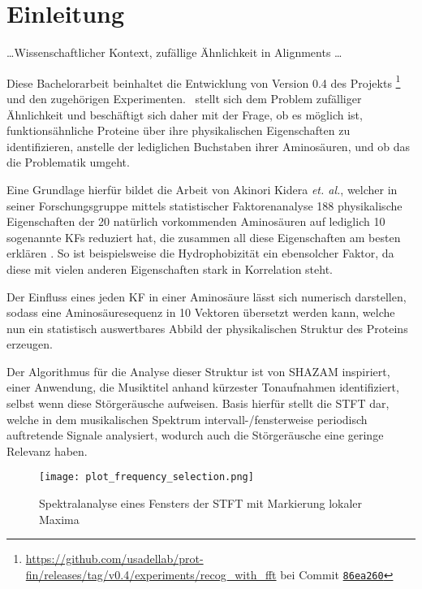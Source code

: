 \section{Einleitung} %
    \label{sec:einleitung}
    \dots Wissenschaftlicher Kontext, zufällige Ähnlichkeit in Alignments \dots

    Diese Bachelorarbeit beinhaltet die Entwicklung von Version 0.4 des Projekts \protfin\footnote{\url{https://github.com/usadellab/prot-fin/releases/tag/v0.4/experiments/recog_with_fft} bei Commit \href{https://github.com/usadellab/prot-fin/tree/86ea260b7c6d7bb520b57e2b29e350bd3942fe71/experiments/recog_with_fft}{\texttt{86ea260}}} und den zugehörigen Experimenten. \protfin\ stellt sich dem Problem zufälliger Ähnlichkeit und beschäftigt sich daher mit der Frage, ob es möglich ist, funktionsähnliche Proteine über ihre physikalischen Eigenschaften zu identifizieren, anstelle der lediglichen Buchstaben ihrer Aminosäuren, und ob das die Problematik umgeht.

    Eine Grundlage hierfür bildet die Arbeit von Akinori Kidera \textit{et. al.}, welcher in seiner Forschungsgruppe mittels statistischer Faktorenanalyse 188 physikalische Eigenschaften der 20 natürlich vorkommenden Aminosäuren auf lediglich 10 sogenannte \acp{KF} reduziert hat, die zusammen all diese Eigenschaften am besten erklären . So ist beispielsweise die Hydrophobizität ein ebensolcher Faktor, da diese mit vielen anderen Eigenschaften stark in Korrelation steht.

    Der Einfluss eines jeden \ac{KF} in einer Aminosäure lässt sich numerisch darstellen, sodass eine Aminosäuresequenz in 10 Vektoren übersetzt werden kann, welche nun ein statistisch auswertbares Abbild der physikalischen Struktur des Proteins erzeugen.

    Der Algorithmus für die Analyse dieser Struktur ist von SHAZAM inspiriert, einer Anwendung, die Musiktitel anhand kürzester Tonaufnahmen identifiziert, selbst wenn diese Störgeräusche aufweisen. Basis hierfür stellt die \ac{STFT} dar, welche in dem musikalischen Spektrum intervall-/fensterweise periodisch auftretende Signale analysiert, wodurch auch die Störgeräusche eine geringe Relevanz haben.

    \begin{wrapfigure}{r}{0.5\textwidth}
        \texttt{[image: plot\_frequency\_selection.png]}
        \caption{Spektralanalyse eines Fensters der \acs{STFT} mit Markierung lokaler Maxima}
        \label{fig:freq_selection}
    \end{wrapfigure}

